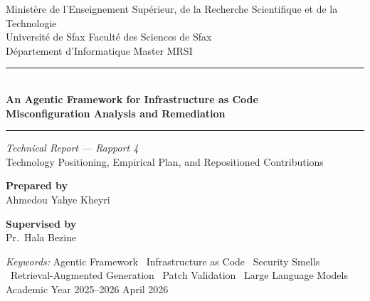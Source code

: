 \documentclass[12pt, a4paper]{report}
\begin{document}

\begin{titlepage}
  \centering

  \vspace*{2.5cm}
  {\small Ministère de l'Enseignement Supérieur, de la Recherche Scientifique
   et de la Technologie}\\[4pt]
  {\small Université de Sfax \enspace\textbar\enspace Faculté des Sciences de Sfax}\\[4pt]
  {\small Département d'Informatique \enspace\textbar\enspace Master MRSI}

  \vspace{2.5cm}

  \noindent\rule{\linewidth}{0.6pt}\\[0.8cm]

  {\Large\bfseries\color{agentblue}
    An Agentic Framework for Infrastructure as Code\\[6pt]
    Misconfiguration Analysis and Remediation
  }\\[0.8cm]

  \noindent\rule{\linewidth}{0.6pt}

  \vspace{0.6cm}
  {\normalsize\itshape Technical Report --- Rapport 4}\\[3pt]
  {\small Technology Positioning, Empirical Plan, and Repositioned Contributions}

  \vspace{2.5cm}
  \begin{minipage}[t]{0.45\textwidth}
    \raggedright
    {\small\bfseries Prepared by}\\[4pt]
    {\normalsize Ahmedou Yahye Kheyri}
  \end{minipage}
  \hfill
  \begin{minipage}[t]{0.45\textwidth}
    \raggedleft
    {\small\bfseries Supervised by}\\[4pt]
    {\normalsize Pr.\ Hala Bezine}
  \end{minipage}

  \vfill
  {\small\textit{Keywords:}\enspace
   Agentic Framework \textbullet\
   Infrastructure as Code \textbullet\
   Security Smells \textbullet\
   Retrieval-Augmented Generation \textbullet\
   Patch Validation \textbullet\
   Large Language Models}\\[1.2cm]

  {\small Academic Year 2025--2026 \enspace\textbar\enspace April 2026}
  \vspace{1cm}

\end{titlepage}
\end{document}
